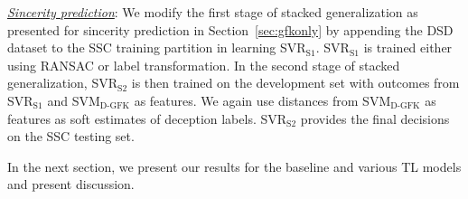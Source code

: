 \documentclass{article}
\begin{document}
\noindent\underline{\it Sincerity prediction}:
We modify the first stage of stacked generalization as presented for sincerity prediction in Section~\ref{sec:gfkonly} by appending the DSD dataset to the SSC training partition in learning SVR$_\text{S1}$.
SVR$_\text{S1}$ is trained either using RANSAC or label transformation. 
In the second stage of stacked generalization, SVR$_\text{S2}$ is then trained on the development set with outcomes from SVR$_\text{S1}$ and SVM$_\text{D-GFK}$ as features.
We again use distances from SVM$_\text{D-GFK}$ as features as soft estimates of deception labels. 
SVR$_\text{S2}$ provides the final decisions on the SSC testing set.

In the next section, we present our results for the baseline and various TL models and present discussion.

\end{document}
